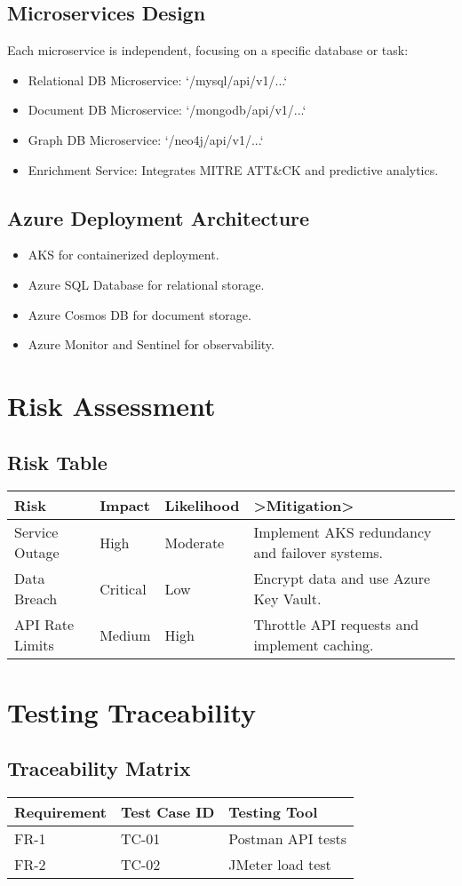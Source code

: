 \documentclass[12pt]{article}
\begin{document}
\subsection{Microservices Design}
Each microservice is independent, focusing on a specific database or task:
\begin{itemize}
    \item Relational DB Microservice: `/mysql/api/v1/...`
    \item Document DB Microservice: `/mongodb/api/v1/...`
    \item Graph DB Microservice: `/neo4j/api/v1/...`
    \item Enrichment Service: Integrates MITRE ATT&CK and predictive analytics.
\end{itemize}

\subsection{Azure Deployment Architecture}
\begin{itemize}
    \item AKS for containerized deployment.
    \item Azure SQL Database for relational storage.
    \item Azure Cosmos DB for document storage.
    \item Azure Monitor and Sentinel for observability.
\end{itemize}

\section{Risk Assessment}
\subsection{Risk Table}
\begin{longtable}{|p{3cm}|p{4cm}|p{4cm}|p{4cm}|}
\hline
\textbf{Risk} & \textbf{Impact} & \textbf{Likelihood} & \textbf>Mitigation> \\ 
\hline
Service Outage & High & Moderate & Implement AKS redundancy and failover systems. \\ 
\hline
Data Breach & Critical & Low & Encrypt data and use Azure Key Vault. \\ 
\hline
API Rate Limits & Medium & High & Throttle API requests and implement caching. \\ 
\hline
\end{longtable}

\section{Testing Traceability}
\subsection{Traceability Matrix}
\begin{longtable}{|p{3cm}|p{4cm}|p{5cm}|}
\hline
\textbf{Requirement} & \textbf{Test Case ID} & \textbf{Testing Tool} \\
\hline
FR-1 & TC-01 & Postman API tests \\
\hline
FR-2 & TC-02 & JMeter load test \\
\hline
\end{longtable}
\end{document}
